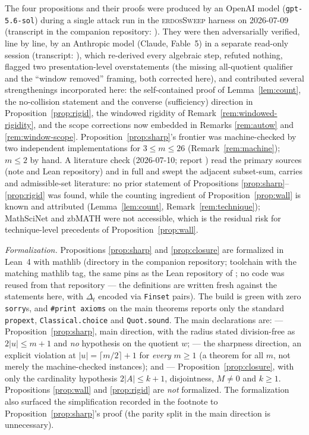 \documentclass[11pt]{article}
\theoremstyle{definition}
\theoremstyle{remark}
\begin{document}
The four propositions and their proofs were produced by an OpenAI model
(\texttt{gpt-5.6-sol}) during a single attack run in the
\textsc{erdosSweep} harness on 2026-07-09 (transcript in the companion
repository:
).
They were then adversarially verified, line by line, by an Anthropic
model (Claude, Fable~5) in a separate read-only session (transcript:
),
which re-derived every algebraic step, refuted nothing, flagged two
presentation-level overstatements (the missing all-quotient qualifier
and the ``window removed'' framing, both corrected here), and
contributed several strengthenings incorporated here: the self-contained proof of
Lemma~\ref{lem:count}, the no-collision statement and the converse
(sufficiency) direction in Proposition~\ref{prop:rigid}, the windowed
rigidity of Remark~\ref{rem:windowed-rigidity}, and the scope
corrections now embedded in Remarks \ref{rem:autow} and
\ref{rem:window-scope}. Proposition~\ref{prop:sharp}'s frontier was
machine-checked by two independent implementations for $3\le m\le26$
(Remark~\ref{rem:machine}); $m\le2$ by hand. A literature check
(2026-07-10; report
)
read the primary sources \cite{Mazur26} (note and Lean repository) and
\cite{BP22} in full and swept the adjacent subset-sum, carries and
admissible-set literature: no prior statement of Propositions
\ref{prop:sharp}--\ref{prop:rigid} was found, while the counting
ingredient of Proposition~\ref{prop:wall} is known and attributed
(Lemma~\ref{lem:count}, Remark~\ref{rem:technique}); MathSciNet and
zbMATH were not accessible, which is the residual risk for
technique-level precedents of Proposition~\ref{prop:wall}.

\emph{Formalization.} Propositions \ref{prop:sharp} and
\ref{prop:closure} are formalized in Lean~4 with mathlib (directory
 in the companion repository; toolchain
 with the matching mathlib tag, the
same pins as the Lean repository of \cite{Mazur26}; no code was reused
from that repository --- the definitions are written fresh against the
statements here, with $\Delta_t$ encoded via \texttt{Finset} pairs). The
build is green with zero \texttt{sorry}s, and \texttt{\#print axioms} on
the main theorems reports only the standard \texttt{propext},
\texttt{Classical.choice} and \texttt{Quot.sound}. The main declarations
are:  --- Proposition~\ref{prop:sharp},
main direction, with the radius stated division-free as $2|u|\le m+1$
and \emph{no} hypothesis on the quotient $w$;
 --- the sharpness direction, an
explicit violation at $|u|=\lceil m/2\rceil+1$ for \emph{every} $m\ge1$
(a theorem for all $m$, not merely the machine-checked instances); and
 --- Proposition~\ref{prop:closure},
with only the cardinality hypothesis $2|A|\le k+1$, disjointness,
$M\ne0$ and $k\ge1$. Propositions \ref{prop:wall} and \ref{prop:rigid}
are \emph{not} formalized. The formalization also surfaced the
simplification recorded in the footnote to
Proposition~\ref{prop:sharp}'s proof (the parity split in the main
direction is unnecessary).
\end{document}
